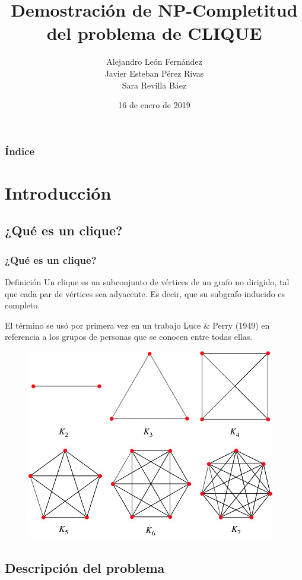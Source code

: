 \documentclass{beamer}
\title[NP-Completitud de CLIQUE]{Demostración de NP-Completitud del problema de CLIQUE}
\author[A.L.F., J.P.R., S.R.B.]{
    Alejandro León Fernández \\
    Javier Esteban Pérez Rivas \\
    Sara Revilla Báez
}
\institute[ULL]{Universidad de La Laguna}
\date{16 de enero de 2019}
\begin{document}
\begin{frame}
    \titlepage %
\end{frame}

\begin{frame}
    \frametitle{Índice}
    \tableofcontents
\end{frame}


\section{Introducción}

\subsection{¿Qué es un clique?}

\begin{frame}
\frametitle{¿Qué es un clique?}
    \begin{block}{Definición}
    Un clique es un subconjunto de vértices de un grafo no dirigido, tal que cada par de vértices sea adyacente. Es decir, que su subgrafo inducido es completo.
    \end{block}
    El término se usó por primera vez en un trabajo Luce \& Perry (1949) en referencia a los grupos de personas que se conocen entre todas ellas.
    
    \begin{figure}
    \includegraphics[width=0.5\linewidth]{img/complete_graphs.jpg}
    \end{figure}
\end{frame}

\subsection{Descripción del problema}
\end{document}
